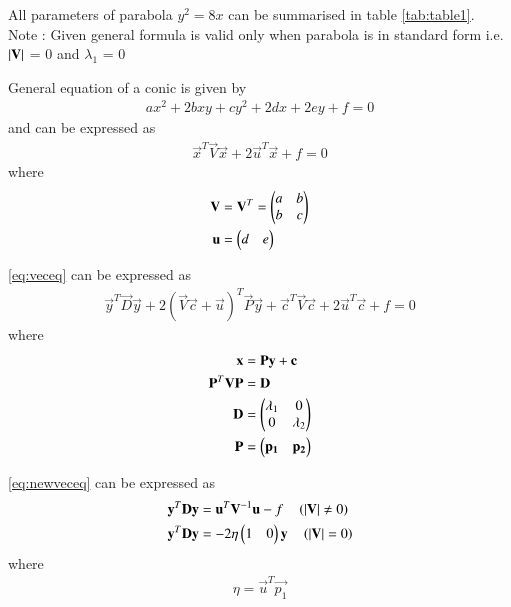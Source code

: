 \documentclass[journal,12pt,twocolumn]{IEEEtran}
\begin{document}
All parameters of parabola $y^2=8x$ can be summarised in table \ref{tab:table1}.
\\
Note : Given general formula is valid only when parabola is in standard form i.e. $\left\vert\mathbf{V}\right\vert$ = 0 and $\lambda_1$ = 0 

\begin{lemma}
General equation of a conic is given by
\begin{align}
ax^2+2bxy+cy^2+2dx+2ey+f=0 \label{eq:geneq}
\end{align}
and can be expressed as 
\begin{align}
    \vec{x}^T\vec{V}\vec{x} + 2\vec{u}^T\vec{x} + f = 0 \label{eq:veceq}
\end{align}
where
\begin{align}
    \mathbf{V}&=\mathbf{V}^T=\begin{pmatrix}a & b\\b & c\end{pmatrix}
    \\
    \mathbf{u}&=\begin{pmatrix}d & e\end{pmatrix}
\end{align}
\end{lemma}

\begin{lemma}
\eqref{eq:veceq} can be expressed as 
\begin{align}
    \vec{y}^T\vec{D}\vec{y} + 2(\vec{V}\vec{c} + \vec{u})^T \vec{P}\vec{y} + \vec{c}^T\vec{V}\vec{c} + 2\vec{u}^T\vec{c} + f = 0 \label{eq:newveceq}
\end{align}
where
\begin{align}
    \mathbf{x} &= \mathbf{P}\mathbf{y}+\mathbf{c} \\
    \mathbf{P}^T\mathbf{V}\mathbf{P} &= \mathbf{D} \\
    \mathbf{D} &= \begin{pmatrix}\lambda_1 & 0 \\ 0 & \lambda_2\end{pmatrix}\\
    \mathbf{P} &= \begin{pmatrix}\mathbf{p_1} & \mathbf{p_2}\end{pmatrix}
\end{align}
\end{lemma}

\begin{lemma}
\eqref{eq:newveceq} can be expressed as 
\begin{align}
 \mathbf{y}^T\mathbf{D}\mathbf{y} &= \mathbf{u}^T\mathbf{V}^{-1}\mathbf{u} - f \quad \left(\left\vert\mathbf{V}\right\vert \neq 0\right) \label{eq:stdvecneq}
 \\
\mathbf{y}^T\mathbf{D}\mathbf{y} &= -2\eta\begin{pmatrix}1 & 0\end{pmatrix}\mathbf{y} \quad \left(\left\vert\mathbf{V}\right\vert = 0\right) \label{eq:stdveceq}
\end{align} 
where
\begin{align}
    \eta = \vec{u}^T\vec{p_1}
\end{align}
\end{lemma}
\end{document}
